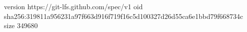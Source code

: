 version https://git-lfs.github.com/spec/v1
oid sha256:319811a956231a97f663d916f719f16c5d100327d26d55ca6e1bbd79f668734c
size 349680
